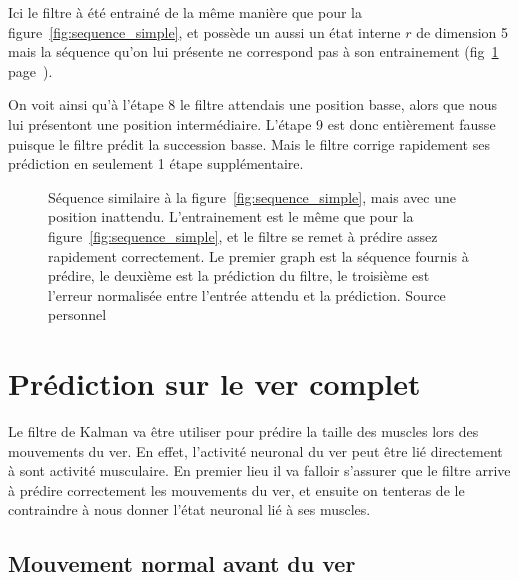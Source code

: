 Ici le filtre à été entrainé de la même manière que pour la
figure~\ref{fig:sequence_simple}, et possède un aussi un état interne $r$ de
dimension 5 mais la séquence qu'on lui présente ne correspond pas à son
entrainement (fig~\ref{fig:sequence_simple_erreur}
page~\pageref{fig:sequence_simple_erreur}).

On voit ainsi qu'à l'étape 8 le filtre attendais une position basse, alors que
nous lui présentont une position intermédiaire. L'étape 9 est donc entièrement
fausse puisque le filtre prédit la succession basse. Mais le filtre corrige
rapidement ses prédiction en seulement 1 étape supplémentaire.

\begin{figure}[ht]
   \begin{center}
   \end{center}
   \caption[Prédiction de séquence simple, avec erreur]{Séquence similaire à la
   figure~\ref{fig:sequence_simple}, mais avec une position inattendu.
   L'entrainement est le même que pour la figure~\ref{fig:sequence_simple}, et
   le filtre se remet à prédire assez rapidement correctement. Le premier graph
   est la séquence fournis à prédire, le deuxième est la prédiction du filtre,
   le troisième est l'erreur normalisée entre l'entrée attendu et la
   prédiction. Source personnel}
   \label{fig:sequence_simple_erreur}
\end{figure}



\section{Prédiction sur le ver complet} %
\label{sec:Prédiction sur le ver complet}

Le filtre de Kalman va être utiliser pour prédire la taille des muscles lors
des mouvements du ver. En effet, l'activité neuronal du ver peut être lié
directement à sont activité musculaire.  En premier lieu il va falloir
s'assurer que le filtre arrive à prédire correctement les mouvements du ver, et
ensuite on tenteras de le contraindre à nous donner l'état neuronal lié à ses
muscles.

\subsection{Mouvement normal avant du ver} %
\label{sub:Mouvement normal avant du ver}

